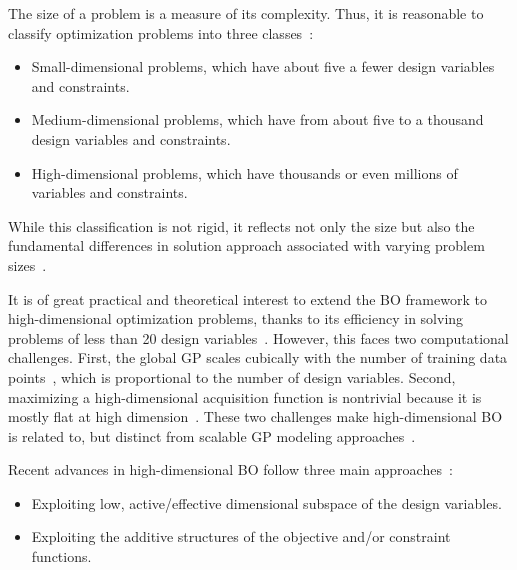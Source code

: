 \documentclass[iicol,sn-basic]{sn-jnl}%
\theoremstyle{thmstyleone}%
\theoremstyle{thmstyletwo}
\theoremstyle{thmstylethree}
\begin{document}
\begin{linenumbers}
The size of a problem is a measure of its complexity.
Thus, it is reasonable to classify optimization problems into three classes~\citep{Luenberger2008}: 
\begin{itemize}
	\item Small-dimensional problems, which have about five a fewer design variables and constraints.
	
	\item Medium-dimensional problems, which have from about five to a thousand design variables and constraints.
	
	\item High-dimensional problems, which have thousands or even millions of variables and constraints.
\end{itemize}
While this classification is not rigid, it reflects not only the size but also the fundamental differences in solution approach associated with varying problem sizes~\citep{Luenberger2008}.

It is of great practical and theoretical interest to extend the BO framework to high-dimensional optimization problems, thanks to its efficiency in solving problems of less than 20 design variables~\citep{Frazier2018}.
However, this faces two computational challenges.
First, the global GP scales cubically with the number of training data points~\citep{Rasmussen2006,Snoek2015}, which is proportional to the number of design variables.
Second, maximizing a high-dimensional acquisition function is nontrivial because it is mostly flat at high dimension~\citep{Rana2017}.
These two challenges make high-dimensional BO is related to, but distinct from scalable GP modeling approaches~\citep{HLiu2020}. 


Recent advances in high-dimensional BO follow three main approaches~\citep{Daulton2022a}: 
\begin{itemize}
	\item Exploiting low, active/effective dimensional subspace of the design variables.
	
	\item Exploiting the additive structures of the objective and/or constraint functions.
	

\end{itemize}
\end{linenumbers}
\end{document}
